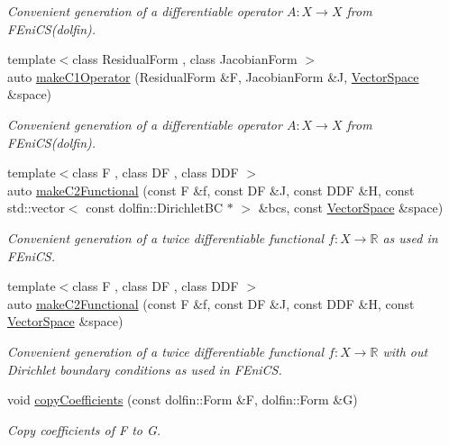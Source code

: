 \begin{DoxyCompactItemize}
\begin{DoxyCompactList}\small\item\em Convenient generation of a differentiable operator $A: X\rightarrow X$ from F\+Eni\+C\+S(dolfin). \end{DoxyCompactList}\item 
{\footnotesize template$<$class Residual\+Form , class Jacobian\+Form $>$ }\\auto \hyperlink{namespaceSpacy_1_1FEniCS_a508af586ecdbc9f099759ffec06e99df}{make\+C1\+Operator} (Residual\+Form \&F, Jacobian\+Form \&J, \hyperlink{classSpacy_1_1VectorSpace}{Vector\+Space} \&space)
\begin{DoxyCompactList}\small\item\em Convenient generation of a differentiable operator $A: X\rightarrow X$ from F\+Eni\+C\+S(dolfin). \end{DoxyCompactList}\item 
{\footnotesize template$<$class F , class D\+F , class D\+D\+F $>$ }\\auto \hyperlink{namespaceSpacy_1_1FEniCS_a78db716003d17d5f781dfcb13a183519}{make\+C2\+Functional} (const F \&f, const D\+F \&J, const D\+D\+F \&H, const std\+::vector$<$ const dolfin\+::\+Dirichlet\+B\+C $\ast$ $>$ \&bcs, const \hyperlink{classSpacy_1_1VectorSpace}{Vector\+Space} \&space)
\begin{DoxyCompactList}\small\item\em Convenient generation of a twice differentiable functional $f: X\rightarrow \mathbb{R}$ as used in F\+Eni\+C\+S. \end{DoxyCompactList}\item 
{\footnotesize template$<$class F , class D\+F , class D\+D\+F $>$ }\\auto \hyperlink{namespaceSpacy_1_1FEniCS_a4e69e5b7265feac21653bfc2da725a75}{make\+C2\+Functional} (const F \&f, const D\+F \&J, const D\+D\+F \&H, const \hyperlink{classSpacy_1_1VectorSpace}{Vector\+Space} \&space)
\begin{DoxyCompactList}\small\item\em Convenient generation of a twice differentiable functional $f: X\rightarrow \mathbb{R}$ with out Dirichlet boundary conditions as used in F\+Eni\+C\+S. \end{DoxyCompactList}\item 
void \hyperlink{group__FenicsGroup_gab3d4c7c1e91a50e4e816598258b6edce}{copy\+Coefficients} (const dolfin\+::\+Form \&F, dolfin\+::\+Form \&G)
\begin{DoxyCompactList}\small\item\em Copy coefficients of F to G. \end{DoxyCompactList}\item 

\end{DoxyCompactItemize}
